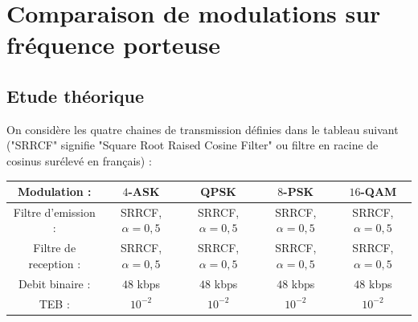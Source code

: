 \documentclass{article}
\begin{document}
\section{Comparaison de modulations sur fréquence porteuse}

\subsection{Etude théorique}
On considère les quatre chaines de transmission définies dans le tableau suivant ("SRRCF" signifie "Square Root Raised Cosine Filter" ou filtre en racine de cosinus surélevé en français) :

\begin{table} [H]
\begin{center}
  \begin{tabular}{ |c || c | c | c | c |}
    \hline
    Modulation : & $4$-ASK & QPSK & $8$-PSK & $16$-QAM \\ \hline
    Filtre d'emission : & SRRCF, $\alpha=0,5$ & SRRCF, $\alpha=0,5$ & SRRCF, $\alpha=0,5$ & SRRCF, $\alpha=0,5$ \\ \hline
    Filtre de reception : & SRRCF, $\alpha=0,5$ & SRRCF, $\alpha=0,5$ & SRRCF, $\alpha=0,5$ & SRRCF, $\alpha=0,5$ \\ \hline
    Debit binaire : & $48$ kbps & $48$ kbps & $48$ kbps & $48$ kbps \\ \hline
    TEB :  & $10^{-2}$ & $10^{-2}$ & $10^{-2}$ & $10^{-2}$ \\ \hline
    \hline

  \end{tabular}
\end{center}
  \label{table:minus6db}
\end{table}
\end{document}
